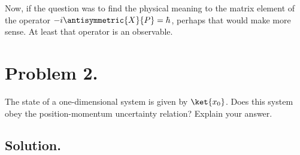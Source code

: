 Now, if the question was to find the physical meaning to the matrix element of the operator $-i\antisymmetric{X}{P} = \hbar$, perhaps that would make more sense.  At least that operator is an observable.

\section{Problem 2.}

The state of a one-dimensional system is given by $\ket{x_0}$. Does this system obey the position-momentum uncertainty relation? Explain your answer.

\subsection{Solution.}

\EndNoBibArticle
